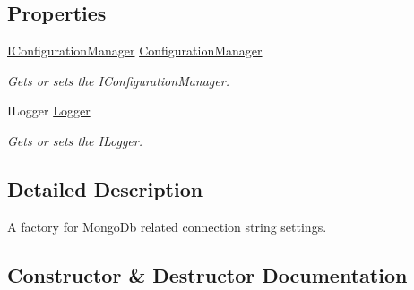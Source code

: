 \subsection*{Properties}
\begin{DoxyCompactItemize}
\item 
\hyperlink{interfaceCqrs_1_1Configuration_1_1IConfigurationManager}{I\+Configuration\+Manager} \hyperlink{classCqrs_1_1Mongo_1_1Factories_1_1MongoDataStoreConnectionStringFactory_a8bedb4433addd1adc1a20ee38893686d_a8bedb4433addd1adc1a20ee38893686d}{Configuration\+Manager}
\begin{DoxyCompactList}\small\item\em Gets or sets the I\+Configuration\+Manager. \end{DoxyCompactList}\item 
I\+Logger \hyperlink{classCqrs_1_1Mongo_1_1Factories_1_1MongoDataStoreConnectionStringFactory_acc607022a5ff77a44aa7987cab70672a_acc607022a5ff77a44aa7987cab70672a}{Logger}
\begin{DoxyCompactList}\small\item\em Gets or sets the I\+Logger. \end{DoxyCompactList}\end{DoxyCompactItemize}


\subsection{Detailed Description}
A factory for Mongo\+Db related connection string settings. 



\subsection{Constructor \& Destructor Documentation}
\mbox{\label{classCqrs_1_1Mongo_1_1Factories_1_1MongoDataStoreConnectionStringFactory_acad4a48959c7d40b5934663d1b71f414_acad4a48959c7d40b5934663d1b71f414}} 

